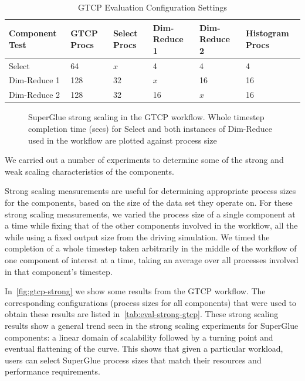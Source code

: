 \begin{table}[tbp]
  \centering
  \caption{GTCP Evaluation Configuration Settings}
  \label{tab:eval-strong-gtcp}
  \vspace{-0.05in}
  \begin{tabular}{|l|l|l|l|l|l|}
    \hline
    Component Test & GTCP Procs & Select Procs & Dim-Reduce 1 & Dim-Reduce 2 & Histogram Procs \\
    \hline
    Select & 64 & $x$ & 4 & 4 & 4\\
    \hline
    Dim-Reduce 1 & 128 & 32 & $x$ & 16 & 16\\
    \hline
    Dim-Reduce 2 & 128 & 32 & 16 & $x$ & 16\\
    \hline
  \end{tabular}
  \vspace{-0.07in}
\end{table}

\begin{figure}
  \centering
  
  
  \caption{SuperGlue strong scaling in the GTCP workflow. Whole timestep
    completion time (secs) for Select and both instances of Dim-Reduce used in
    the workflow are plotted against process size}
  \label{fig:gtcp-strong}
  \vspace{-0.25in}
\end{figure}

We carried out a number of experiments
to determine some of the strong and weak scaling
characteristics of the components.

Strong scaling measurements are useful for
determining appropriate process sizes
for the components, based on the size of the
data set they operate on.
For these strong scaling measurements,
we varied the process size of a single component at
a time while fixing that of the
other components involved in the workflow,
all the while using a fixed output size from
the driving simulation.
We timed the completion of a whole timestep
taken arbitrarily in the middle of the workflow
of one component of interest at a time,
taking an average over all processes
involved in that component's timestep.

In~\autoref{fig:gtcp-strong} we show some results 
from the GTCP workflow.
The corresponding configurations (process sizes for all components)
that were used to obtain these results are listed
in~\autoref{tab:eval-strong-gtcp}.
These strong scaling results show a general trend
seen in the strong scaling experiments for SuperGlue
components: a linear domain of scalability followed
by a turning point and eventual flattening
of the curve. This shows
that given
a particular workload, users can select SuperGlue process sizes
that match their resources and performance requirements.

